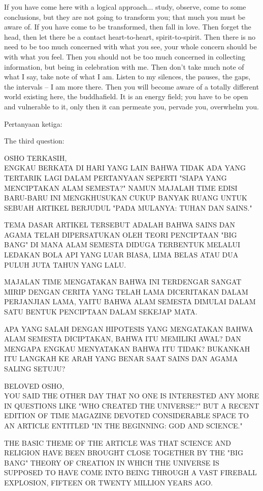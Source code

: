 \english
If you have come here with a logical approach... study, observe, come to some
conclusions, but they are not going to transform you; that much you must be aware of. If you have come to be transformed, then fall in love. Then forget the head, then let there be a contact heart-to-heart, spirit-to-spirit. Then there is no need to be too much concerned with what you see, your whole concern should be with what you feel. Then you should not be too much concerned in collecting information, but being in celebration with me. Then don't take much note of what I say, take note of what I am. Listen to my silences, the pauses, the gaps, the intervals -- I am more there. Then you will become aware of a totally different world existing here, the buddhafield. It is an energy field; you have to be open and vulnerable to it, only then it can permeate you, pervade you, overwhelm you.

\bahasa
Pertanyaan ketiga:

\english
The third question:

\bahasa
OSHO TERKASIH,\\
ENGKAU BERKATA DI HARI YANG LAIN BAHWA TIDAK ADA YANG TERTARIK LAGI DALAM PERTANYAAN SEPERTI "SIAPA YANG MENCIPTAKAN ALAM SEMESTA?" NAMUN MAJALAH TIME EDISI BARU-BARU INI MENGKHUSUKAN CUKUP BANYAK RUANG UNTUK SEBUAH ARTIKEL BERJUDUL "PADA MULANYA: TUHAN DAN SAINS."

TEMA DASAR ARTIKEL TERSEBUT ADALAH BAHWA SAINS DAN AGAMA TELAH DIPERSATUKAN OLEH TEORI PENCIPTAAN "BIG BANG" DI MANA ALAM SEMESTA DIDUGA TERBENTUK MELALUI LEDAKAN BOLA API YANG LUAR BIASA, LIMA BELAS ATAU DUA PULUH JUTA TAHUN YANG LALU.

MAJALAN TIME MENGATAKAN BAHWA INI TERDENGAR SANGAT MIRIP DENGAN CERITA YANG TELAH LAMA DICERITAKAN DALAM PERJANJIAN LAMA, YAITU BAHWA ALAM SEMESTA DIMULAI DALAM SATU BENTUK PENCIPTAAN DALAM SEKEJAP MATA.

APA YANG SALAH DENGAN HIPOTESIS YANG MENGATAKAN BAHWA ALAM SEMESTA DICIPTAKAN, BAHWA ITU MEMILIKI AWAL? DAN MENGAPA ENGKAU MENYATAKAN BAHWA ITU TIDAK? BUKANKAH ITU LANGKAH KE ARAH YANG BENAR SAAT SAINS DAN AGAMA SALING SETUJU?

\english
BELOVED OSHO,\\
YOU SAID THE OTHER DAY THAT NO ONE IS INTERESTED ANY MORE IN QUESTIONS LIKE "WHO CREATED THE UNIVERSE?" BUT A RECENT EDITION OF TIME MAGAZINE DEVOTED CONSIDERABLE SPACE TO AN ARTICLE ENTITLED "IN THE BEGINNING: GOD AND SCIENCE."

THE BASIC THEME OF THE ARTICLE WAS THAT SCIENCE AND RELIGION HAVE BEEN BROUGHT CLOSE TOGETHER BY THE "BIG BANG" THEORY OF CREATION IN WHICH THE UNIVERSE IS SUPPOSED TO HAVE COME INTO BEING THROUGH A VAST FIREBALL EXPLOSION, FIFTEEN OR TWENTY MILLION YEARS AGO.


